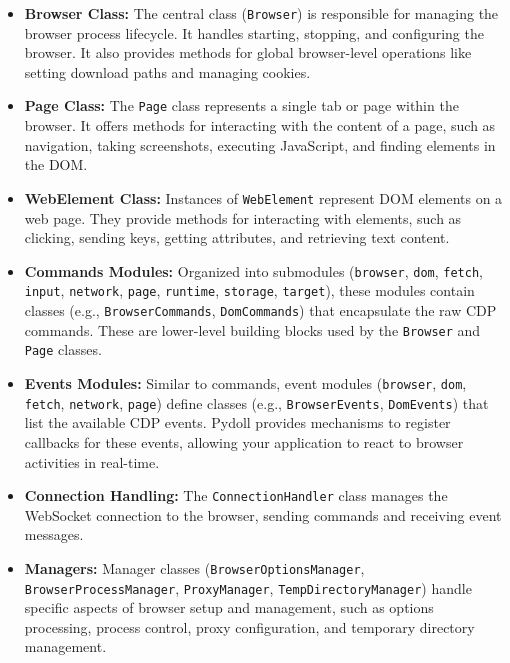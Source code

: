 \documentclass{article}
\begin{document}
\begin{itemize}
    \item \textbf{Browser Class:} The central class (\lstinline[style=pythonstyle]|Browser|) is responsible for managing the browser process lifecycle. It handles starting, stopping, and configuring the browser. It also provides methods for global browser-level operations like setting download paths and managing cookies.
    \item \textbf{Page Class:} The \lstinline[style=pythonstyle]|Page| class represents a single tab or page within the browser. It offers methods for interacting with the content of a page, such as navigation, taking screenshots, executing JavaScript, and finding elements in the DOM.
    \item \textbf{WebElement Class:} Instances of \lstinline[style=pythonstyle]|WebElement| represent DOM elements on a web page. They provide methods for interacting with elements, such as clicking, sending keys, getting attributes, and retrieving text content.
    \item \textbf{Commands Modules:} Organized into submodules (\lstinline[style=pythonstyle]|browser|, \lstinline[style=pythonstyle]|dom|, \lstinline[style=pythonstyle]|fetch|, \lstinline[style=pythonstyle]|input|, \lstinline[style=pythonstyle]|network|, \lstinline[style=pythonstyle]|page|, \lstinline[style=pythonstyle]|runtime|, \lstinline[style=pythonstyle]|storage|, \lstinline[style=pythonstyle]|target|), these modules contain classes (e.g., \lstinline[style=pythonstyle]|BrowserCommands|, \lstinline[style=pythonstyle]|DomCommands|) that encapsulate the raw CDP commands. These are lower-level building blocks used by the \lstinline[style=pythonstyle]|Browser| and \lstinline[style=pythonstyle]|Page| classes.
    \item \textbf{Events Modules:} Similar to commands, event modules (\lstinline[style=pythonstyle]|browser|, \lstinline[style=pythonstyle]|dom|, \lstinline[style=pythonstyle]|fetch|, \lstinline[style=pythonstyle]|network|, \lstinline[style=pythonstyle]|page|) define classes (e.g., \lstinline[style=pythonstyle]|BrowserEvents|, \lstinline[style=pythonstyle]|DomEvents|) that list the available CDP events. Pydoll provides mechanisms to register callbacks for these events, allowing your application to react to browser activities in real-time.
    \item \textbf{Connection Handling:} The \lstinline[style=pythonstyle]|ConnectionHandler| class manages the WebSocket connection to the browser, sending commands and receiving event messages.
    \item \textbf{Managers:} Manager classes (\lstinline[style=pythonstyle]|BrowserOptionsManager|, \lstinline[style=pythonstyle]|BrowserProcessManager|, \lstinline[style=pythonstyle]|ProxyManager|, \lstinline[style=pythonstyle]|TempDirectoryManager|) handle specific aspects of browser setup and management, such as options processing, process control, proxy configuration, and temporary directory management.
\end{itemize}
\end{document}
